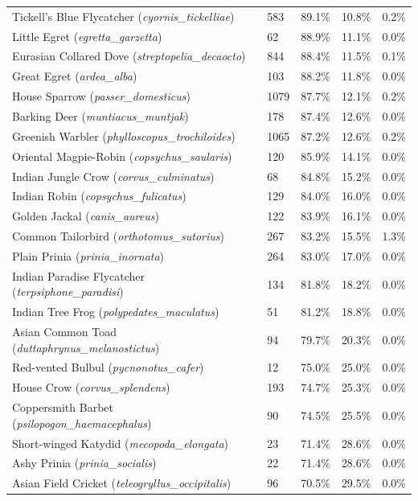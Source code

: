 \documentclass[11pt]{article}
\begin{document}
\begin{longtable}{llccc}
Tickell's Blue Flycatcher (\textit{cyornis\_tickelliae}) & 583 & 89.1\% & 10.8\% & 0.2\% \\
Little Egret (\textit{egretta\_garzetta}) & 62 & 88.9\% & 11.1\% & 0.0\% \\
Eurasian Collared Dove (\textit{streptopelia\_decaocto}) & 844 & 88.4\% & 11.5\% & 0.1\% \\
Great Egret (\textit{ardea\_alba}) & 103 & 88.2\% & 11.8\% & 0.0\% \\
House Sparrow (\textit{passer\_domesticus}) & 1079 & 87.7\% & 12.1\% & 0.2\% \\
Barking Deer (\textit{muntiacus\_muntjak}) & 178 & 87.4\% & 12.6\% & 0.0\% \\
Greenish Warbler (\textit{phylloscopus\_trochiloides}) & 1065 & 87.2\% & 12.6\% & 0.2\% \\
Oriental Magpie-Robin (\textit{copsychus\_saularis}) & 120 & 85.9\% & 14.1\% & 0.0\% \\
Indian Jungle Crow (\textit{corvus\_culminatus}) & 68 & 84.8\% & 15.2\% & 0.0\% \\
Indian Robin (\textit{copsychus\_fulicatus}) & 129 & 84.0\% & 16.0\% & 0.0\% \\
Golden Jackal (\textit{canis\_aureus}) & 122 & 83.9\% & 16.1\% & 0.0\% \\
Common Tailorbird (\textit{orthotomus\_sutorius}) & 267 & 83.2\% & 15.5\% & 1.3\% \\
Plain Prinia (\textit{prinia\_inornata}) & 264 & 83.0\% & 17.0\% & 0.0\% \\
Indian Paradise Flycatcher (\textit{terpsiphone\_paradisi}) & 134 & 81.8\% & 18.2\% & 0.0\% \\
Indian Tree Frog (\textit{polypedates\_maculatus}) & 51 & 81.2\% & 18.8\% & 0.0\% \\
Asian Common Toad (\textit{duttaphrynus\_melanostictus}) & 94 & 79.7\% & 20.3\% & 0.0\% \\
Red-vented Bulbul (\textit{pycnonotus\_cafer}) & 12 & 75.0\% & 25.0\% & 0.0\% \\
House Crow (\textit{corvus\_splendens}) & 193 & 74.7\% & 25.3\% & 0.0\% \\
Coppersmith Barbet (\textit{psilopogon\_haemacephalus}) & 90 & 74.5\% & 25.5\% & 0.0\% \\
Short-winged Katydid (\textit{mecopoda\_elongata}) & 23 & 71.4\% & 28.6\% & 0.0\% \\
Ashy Prinia (\textit{prinia\_socialis}) & 22 & 71.4\% & 28.6\% & 0.0\% \\
Asian Field Cricket (\textit{teleogryllus\_occipitalis}) & 96 & 70.5\% & 29.5\% & 0.0\% \\

\end{longtable}
\end{document}
